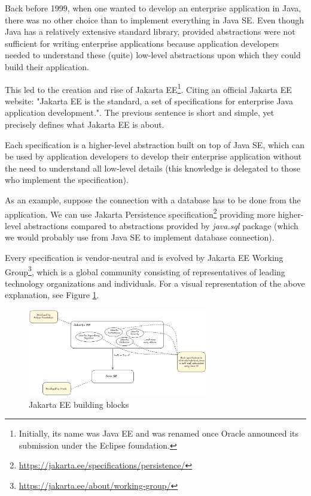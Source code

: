 \documentclass[../main.tex]{subfiles}
\begin{document}
Back before 1999, when one wanted to develop an enterprise application in Java, there was no other choice than to implement everything in Java SE. Even though Java has a relatively extensive standard library, provided abstractions were not sufficient for writing enterprise applications because application developers needed to understand these (quite) low-level abstractions upon which they could build their application.

This led to the creation and rise of Jakarta EE\footnote{Initially, its name was Java EE and was renamed once Oracle announced its submission under the Eclipse foundation.}. Citing an official Jakarta EE website: "Jakarta EE is the standard, a set of specifications for enterprise Java application development."\cite{jakartaee}. The previous sentence is short and simple, yet precisely defines what Jakarta EE is about.

Each specification is a higher-level abstraction built on top of Java SE, which can be used by application developers to develop their enterprise application without the need to understand all low-level details (this knowledge is delegated to those who implement the specification).

As an example, suppose the connection with a database has to be done from the application. We can use Jakarta Persistence specification\footnote{\url{https://jakarta.ee/specifications/persistence/}} providing more higher-level abstractions compared to abstractions provided by \textit{java.sql} package (which we would probably use from Java SE to implement database connection).

Every specification is vendor-neutral and is evolved by Jakarta EE Working Group\footnote{\url{https://jakarta.ee/about/working-group/}}, which is a global community consisting of representatives of leading technology organizations and individuals. For a visual representation of the above explanation, see Figure \ref{fig:jakarta-ee}.

\begin{figure}
  \begin{center}
    \includegraphics[width=0.7\textwidth]{images/jakarta-ee.png}
  \end{center}
  \caption{Jakarta EE building blocks}
  \label{fig:jakarta-ee}
\end{figure}
\end{document}
